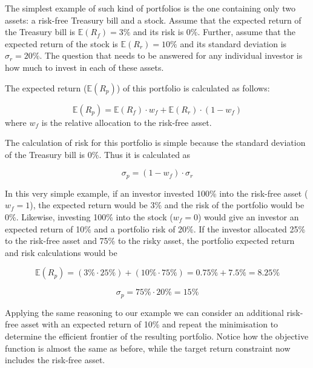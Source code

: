 The simplest example of such kind of portfolios is the one containing only two assets: a risk-free Treasury bill and a stock. Assume that the expected return of the Treasury bill is \(\mathbb{E}(R_f)=3\%\) and its risk is 0\%. Further, assume that the expected return of the stock is \(\mathbb{E}(R_r)=10\%\) and its standard deviation is \(\sigma_r=20\%\). The question that needs to be answered
for any individual investor is how much to invest in each of these
assets.

The expected return (\(\mathbb{E}(R_p)\)) of this portfolio is calculated as follows:

\begin{equation} \mathbb{E}(R_p) = \mathbb{E}(R_f)\cdot w_f + \mathbb{E}(R_r)\cdot (1- w_f) \end{equation}
where \(w_f\) is the relative allocation to the risk-free asset.

The calculation of risk for this portfolio is simple because the
standard deviation of the Treasury bill is 0\%. Thus it is calculated
as

\begin{equation} \sigma_p = (1-w_f)\cdot \sigma_r \end{equation}

In this very simple example, if an investor invested 100\% into
the risk-free asset (\(w_f=1\)), the expected return would be 3\% and
the risk of the portfolio would be 0\%. Likewise, investing 100\% into
the stock (\(w_f=0\)) would give an investor an expected return of 10\%
and a portfolio risk of 20\%. If the investor allocated 25\% to the
risk-free asset and 75\% to the risky asset, the portfolio expected
return and risk calculations would be

\[ \mathbb{E}(R_p) = (3\% \cdot 25\%) + (10\% \cdot 75\%) = 0.75\% + 7.5\% = 8.25\% \]

\[ \sigma_p = 75\% \cdot 20\% = 15\% \]

Applying the same reasoning to our example we can consider an additional
risk-free asset with an expected return of 10\% and repeat the
minimisation to determine the efficient frontier of the resulting
portfolio. Notice how the objective function is almost the same as before, 
while the target return constraint now includes the risk-free asset.

